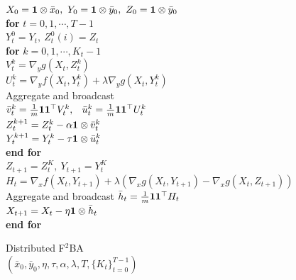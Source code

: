 \documentclass{article}
\begin{document}
\begin{figure}
\begin{minipage}{0.43\textwidth}
\vskip -0.72cm
\begin{algorithm}[H]  
\caption{Distributed F${}^2$BA \\ $\left(\bar x_0,\bar y_0, \eta,\tau,\alpha, \lambda, T,\{K_t\}_{t=0}^{T-1}\right)$} \label{alg:CF2BA}
\begin{algorithmic}[1] 
\STATE $ X_0 = {\bf{1}} \otimes \bar x_0, ~ Y_0 = {\bf{1}} \otimes \bar y_0,~ Z_0 = {\bf{1}} \otimes \bar y_0$ \\[1mm]
\STATE \textbf{for} $ t =0,1,\cdots,T-1 $ \\[1mm]
\STATE \quad $ Y_t^0 =  Y_{t}, ~ Z_t^0(i) = Z_{t}$ \\[1mm]
\STATE \quad \textbf{for} $ k =0,1,\cdots,K_t-1$ \\[1mm]
\STATE \quad \quad  $ V_t^{k} = \nabla_y g(X_t, Z_t^k)   $ \\[1mm]
\STATE \quad \quad  $ U_t^{k} =  \nabla_y f(X_t,Y_t^k) +  \lambda  \nabla_y g(X_t,Y_t^k) $ \\[1mm]
\STATE \quad \quad Aggregate and broadcast \\ $\bar v_t^{k} = \frac{1}{m} {\bf{1}} {\bf{1}}^\top V_t^k, $~ $\bar u_t^{k} = \frac{1}{m} {\bf{1}}   {\bf{1}}^\top U_t^k$ \\[1mm]
\STATE \quad \quad  $ Z_t^{k+1} = Z_t^k - \alpha {\bf{1}} \otimes  \bar v_t^k   $ \\[1mm]
\STATE \quad \quad  $ Y_t^{k+1} = Y_t^k - \tau {\bf{1}} \otimes  \bar u_t^k   $ \\[1mm]
\STATE \quad \textbf{end for} \\[1mm]
\STATE \quad $Z_{t+1} = Z_t^K,~ Y_{t+1} = Y_t^K $ \\[1mm]
\STATE \quad $ H_t= \nabla_x f(X_t,Y_{t+1}) + \lambda ( \nabla_x g(X_t,Y_{t+1}) - \nabla_x g(X_t,Z_{t+1}) )$ \\[1mm]
\STATE \quad Aggregate and broadcast $\bar h_t = \frac{1}{m} {\bf{1}}   {\bf{1}}^\top H_t$ \\[1mm]
\STATE \quad $X_{t+1} = X_t -  \eta  {\bf{1}}  \otimes \bar h_t$ \\[1mm]
\STATE \textbf{end for} \\[1mm]
\end{algorithmic}
\end{algorithm}
\end{minipage}
\vskip -0.6cm
\end{figure}
\end{document}

